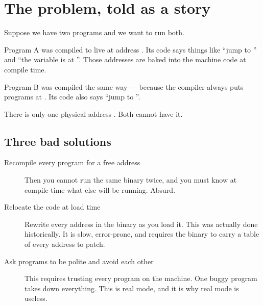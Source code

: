 \section{The problem, told as a story}

Suppose we have two programs and we want to run both.

Program A was compiled to live at address . Its code says things like ``jump to
'' and ``the variable  is at ''. Those addresses are baked
into the machine code at compile time.

Program B was compiled the same way --- because the compiler always puts programs at
. Its code also says ``jump to ''.

\begin{center}
\end{center}

There is only one physical address . Both cannot have it.

\subsection{Three bad solutions}

\begin{description}
  \item[Recompile every program for a free address] Then you cannot run the same binary twice, and
    you must know at compile time what else will be running. Absurd.
  \item[Relocate the code at load time] Rewrite every address in the binary as you load it. This
    was actually done historically. It is slow, error-prone, and requires the binary to carry a
    table of every address to patch.
  \item[Ask programs to be polite and avoid each other] This requires trusting every program on the
    machine. One buggy program takes down everything. This is real mode, and it is why real mode is
    useless.
\end{description}

